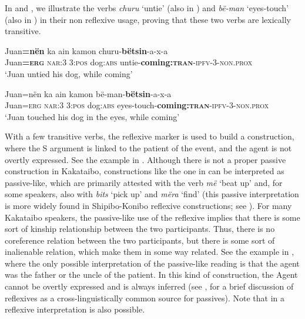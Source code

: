 \documentclass[output=paper,colorlinks,citecolor=brown,modfonts,nonflat]{langscibook}
\begin{document}
In  and , we illustrate the verbs \textit{churu} ‘untie’ (also in ) and \textit{bë-man} ‘eyes-touch’ (also in ) in their non reflexive usage, proving that these two verbs are lexically transitive.

\ea%
    \label{ex:zariquiey:9}
    \gll    Juan\textbf{=nën} ka ain kamon churu-\textbf{bëtsin}-a-x-a\\
            Juan\textbf{=\textsc{erg}} \textsc{nar:3} \textsc{3:pos} dog:\textsc{abs} untie-\textbf{coming:}\textbf{\textsc{tran}}\textsc{-ipfv-3-non.prox}\\
    \glt    ‘Juan untied his dog, while coming’
\z

\ea%
    \label{ex:zariquiey:10}
    \gll    Juan=nën ka ain kamon bë-man-\textbf{bëtsin}-a-x-a\\
            Juan=\textsc{erg} \textsc{nar:3} \textsc{3:pos} dog:\textsc{abs} eyes-touch-\textbf{coming:\textsc{tran}}\textsc{-ipfv-3-non.prox}\\
    \glt    ‘Juan touched his dog in the eyes, while coming’
\z

With a few transitive verbs, the reflexive marker is used to build a construction, where the S argument is linked to the patient of the event, and the agent is not overtly expressed. See the example in . Although there is not a proper passive construction in Kakataibo, constructions like the one in  can be interpreted as passive-like, which are primarily attested with the verb \textit{më} ‘beat up’ and, for some speakers, also with \textit{bits} ‘pick up’ and \textit{mëra} ‘find’ (this passive interpretation is more widely found in Shipibo-Konibo reflexive constructions; see \citealt[775--800]{Valenzuela2003}). For many Kakataibo speakers, the passive-like use of the reflexive implies that there is some sort of kinship relationship between the two participants. Thus, there is no coreference relation between the two participants, but there is some sort of inalienable relation, which make them in some way related. See the example in , where the only possible interpretation of the passive-like reading is that the agent was the father or the uncle of the patient. In this kind of construction, the Agent cannot be overtly expressed and is always inferred (see \citealt[253--254]{Keenan1985}, for a brief discussion of reflexives as a cross-linguistically common source for passives). Note that in  a reflexive interpretation is also possible.
\end{document}
